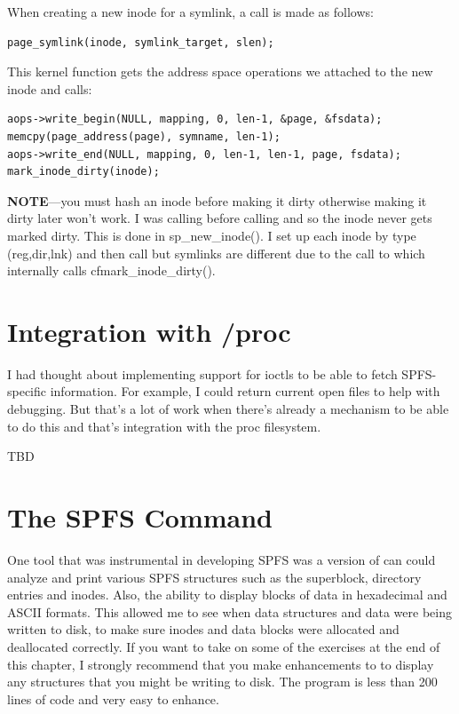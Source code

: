 \noindent
When creating a new inode for a symlink, a call is made as follows:

\begin{lstlisting}
page_symlink(inode, symlink_target, slen);
\end{lstlisting}

\noindent
This kernel function gets the address space operations we attached to the new inode and calls:

\begin{lstlisting}
aops->write_begin(NULL, mapping, 0, len-1, &page, &fsdata);
memcpy(page_address(page), symname, len-1);
aops->write_end(NULL, mapping, 0, len-1, len-1, page, fsdata);
mark_inode_dirty(inode);
\end{lstlisting}

\noindent
{\bf NOTE}---you must hash an inode before making it dirty otherwise making it dirty later won't work. I was calling  before calling  and so the inode never gets marked dirty. This is done in sp\_new\_inode(). I set up each inode by type (reg,dir,lnk) and then call  but symlinks are different due to the call to  which internally calls cf{mark\_inode\_dirty()}.


\section{Integration with /proc}

I had thought about implementing support for ioctls to be able to fetch SPFS-specific information. For example, I could return current open files to help with debugging. But that's a lot of work when there's already a mechanism to be able to do this and that's integration with the proc filesystem.


TBD 


\section{The SPFS  Command}

One tool that was instrumental in developing SPFS was a version of  can could analyze and print various SPFS structures such as the superblock, directory entries and inodes. Also, the ability to display blocks of data in hexadecimal and ASCII formats. This allowed me to see when data structures and data were being written to disk, to make sure inodes and data blocks were allocated and deallocated correctly. If you want to take on some of the exercises at the end of this chapter, I strongly recommend that you make enhancements to  to display any structures that you might be writing to disk. The program is less than 200 lines of code and very easy to enhance.

